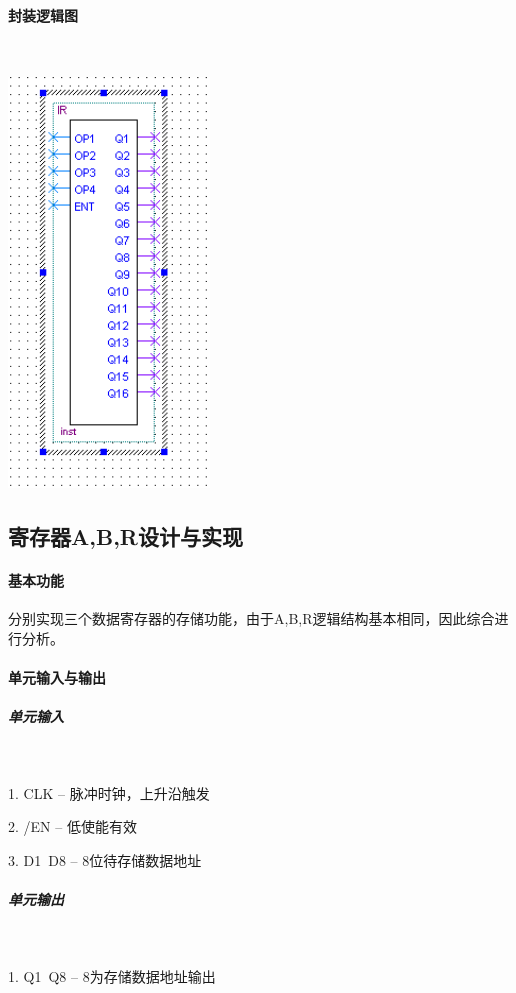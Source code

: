 \documentclass[UTF8]{ctexart}
\begin{document}
    \paragraph{封装逻辑图}

    ~
    
    \includegraphics[width=0.4\textwidth]{./img/指令寄存器IR封装逻辑图.png}

    \subsection{寄存器A,B,R设计与实现}
    \paragraph{基本功能}
    分别实现三个数据寄存器的存储功能，由于A,B,R逻辑结构基本相同，因此综合进行分析。

    \paragraph{单元输入与输出}

    \subparagraph{单元输入}

    ~

    1. CLK -- 脉冲时钟，上升沿触发

    2. /EN -- 低使能有效

    3. D1~D8 -- 8位待存储数据地址

    \subparagraph{单元输出}

    ~

    1. Q1~Q8 -- 8为存储数据地址输出
\end{document}
